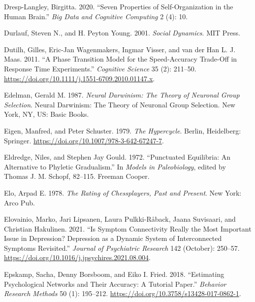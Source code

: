 \documentclass[
  letterpaper,
]{scrbook}
\newlength{\cslhangindent}
\newlength{\cslentryspacingunit} %
\newenvironment{CSLReferences}[2] %
 {%
  \setlength{\parindent}{0pt}
  \ifodd #1
  \let\oldpar\par
  \def\par{\hangindent=\cslhangindent\oldpar}
  \fi
  \setlength{\parskip}{#2\cslentryspacingunit}
 }%
 {}
\begin{document}
\begin{CSLReferences}{1}{0}
\leavevmode{}%
Dresp-Langley, Birgitta. 2020. {``Seven {Properties} of
{Self-Organization} in the {Human Brain}.''} \emph{Big Data and
Cognitive Computing} 2 (4): 10.

\leavevmode{}%
Durlauf, Steven N., and H. Peyton Young. 2001. \emph{Social {Dynamics}}.
{MIT Press}.

\leavevmode{}%
Dutilh, Gilles, Eric-Jan Wagenmakers, Ingmar Visser, and van der Han L.
J. Maas. 2011. {``A {Phase Transition Model} for the {Speed-Accuracy
Trade-Off} in {Response Time Experiments}.''} \emph{Cognitive Science}
35 (2): 211--50. \url{https://doi.org/10.1111/j.1551-6709.2010.01147.x}.

\leavevmode{}%
Edelman, Gerald M. 1987. \emph{Neural {Darwinism}: {The} Theory of
Neuronal Group Selection}. Neural {Darwinism}: {The} Theory of Neuronal
Group Selection. {New York, NY, US}: {Basic Books}.

\leavevmode{}%
Eigen, Manfred, and Peter Schuster. 1979. \emph{The {Hypercycle}}.
{Berlin, Heidelberg}: {Springer}.
\url{https://doi.org/10.1007/978-3-642-67247-7}.

\leavevmode{}%
Eldredge, Niles, and Stephen Jay Gould. 1972. {``Punctuated
{Equilibria}: {An Alternative} to {Phyletic Gradualism}.''} In
\emph{Models in {Paleobiology}}, edited by Thomas J. M. Schopf, 82--115.
{Freeman Cooper}.

\leavevmode{}%
Elo, Arpad E. 1978. \emph{The Rating of Chessplayers, Past and Present}.
{New York}: {Arco Pub}.

\leavevmode{}%
Elovainio, Marko, Jari Lipsanen, Laura Pulkki-Råback, Jaana Suvisaari,
and Christian Hakulinen. 2021. {``Is Symptom Connectivity Really the
Most Important Issue in Depression? {Depression} as a Dynamic System of
Interconnected Symptoms Revisited.''} \emph{Journal of Psychiatric
Research} 142 (October): 250--57.
\url{https://doi.org/10.1016/j.jpsychires.2021.08.004}.

\leavevmode{}%
Epskamp, Sacha, Denny Borsboom, and Eiko I. Fried. 2018. {``Estimating
Psychological Networks and Their Accuracy: {A} Tutorial Paper.''}
\emph{Behavior Research Methods} 50 (1): 195--212.
\url{https://doi.org/10.3758/s13428-017-0862-1}.


\end{CSLReferences}
\end{document}
